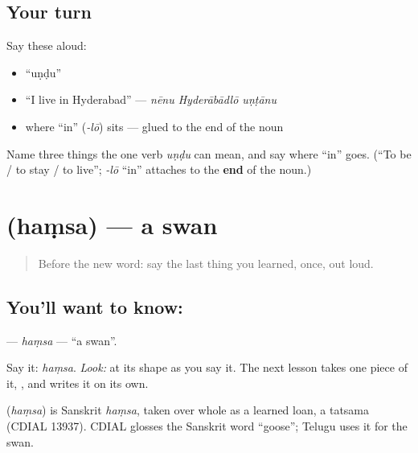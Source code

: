 \subsection*{Your turn}
Say these aloud:

\begin{itemize}
\raggedright
  \item \textquotedblleft{}uṇḍu\textquotedblright{}
  \item \textquotedblleft{}I live in Hyderabad\textquotedblright{} — \emph{nēnu Hyderābādlō uṇṭānu}
  \item where \textquotedblleft{}in\textquotedblright{} (\emph{-lō}) sits — glued to the end of the noun
\end{itemize}

\begin{tcolorbox}[breakable,colback=teal!4,colframe=teal!35!black,title={Before you move on}]
Name three things the one verb \emph{uṇḍu} can mean, and say where \textquotedblleft{}in\textquotedblright{} goes. (\textquotedblleft{}To be / to stay / to live\textquotedblright{}; \emph{-lō} \textquotedblleft{}in\textquotedblright{} attaches to the \textbf{end} of the noun.)
\end{tcolorbox}
\section[\texorpdfstring{\te{హంస} (haṃsa)}{హంస (haṃsa)}]{ (haṃsa) — a swan}

\label{lesson:TE-C05-hamsa}



\begin{quote}
Before the new word: say the last thing you learned, once, out loud.
\end{quote}

\subsection*{You'll want to know: }
\textbf{} — \emph{haṃsa} — \textquotedblleft{}a swan\textquotedblright{}.

Say it: \emph{haṃsa}. \emph{Look:} at its shape as you say it. The next lesson takes one piece of it, \textbf{}, and writes it on its own.

\begin{cousinweb}
\textbf{} (\emph{haṃsa}) is Sanskrit \emph{haṃsa}, taken over whole as a learned loan, a tatsama (CDIAL 13937). CDIAL glosses the Sanskrit word \textquotedblleft{}goose\textquotedblright{}; Telugu uses it for the swan.
\end{cousinweb}

